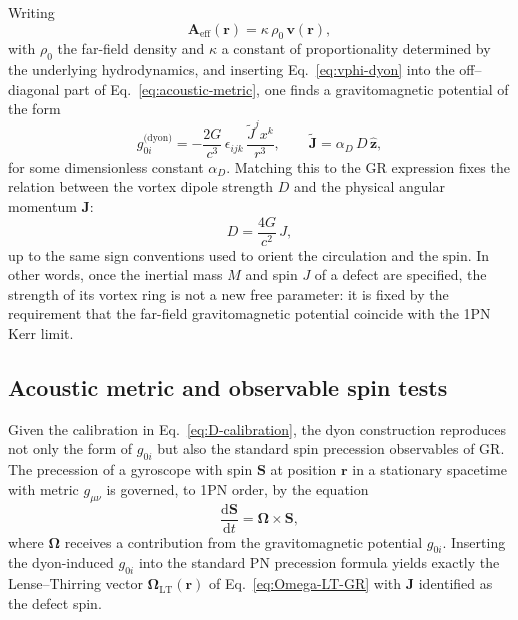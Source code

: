 \documentclass[11pt]{article}
\newcommand{\dd}{\mathrm{d}}
\begin{document}
Writing
\begin{equation}
  \mathbf{A}_{\text{eff}}(\mathbf{r})
  = \kappa\,\rho_0\,\mathbf{v}(\mathbf{r}),
\end{equation}
with $\rho_0$ the far-field density and $\kappa$ a constant of
proportionality determined by the underlying hydrodynamics, and
inserting Eq.~\eqref{eq:vphi-dyon} into the off–diagonal part of
Eq.~\eqref{eq:acoustic-metric}, one finds a gravitomagnetic potential
of the form
\begin{equation}
  g_{0i}^{\text{(dyon)}}
  = -\frac{2G}{c^3}\,
    \epsilon_{ijk}\,\frac{\tilde{J}^j x^k}{r^3},
  \qquad
  \tilde{\mathbf{J}}
  = \alpha_D\,D\,\hat{\mathbf{z}},
\end{equation}
for some dimensionless constant $\alpha_D$.
Matching this to the GR expression fixes the relation between the
vortex dipole strength $D$ and the physical angular momentum
$\mathbf{J}$:
\begin{equation}
  D = \frac{4G}{c^2}\,J,
  \label{eq:D-calibration}
\end{equation}
up to the same sign conventions used to orient the circulation and
the spin.
In other words, once the inertial mass $M$ and spin $J$ of a defect
are specified, the strength of its vortex ring is not a new free
parameter: it is fixed by the requirement that the far-field
gravitomagnetic potential coincide with the 1PN Kerr limit.

\subsection{Acoustic metric and observable spin tests}
\label{subsec:spin-observables}

Given the calibration in Eq.~\eqref{eq:D-calibration}, the dyon
construction reproduces not only the form of $g_{0i}$ but also the
standard spin precession observables of GR.
The precession of a gyroscope with spin $\mathbf{S}$ at position
$\mathbf{r}$ in a stationary spacetime with metric $g_{\mu\nu}$ is
governed, to 1PN order, by the equation
\begin{equation}
  \frac{\dd\mathbf{S}}{\dd t}
  = \bm{\Omega}\times\mathbf{S},
\end{equation}
where $\bm{\Omega}$ receives a contribution from the
gravitomagnetic potential $g_{0i}$.
Inserting the dyon-induced $g_{0i}$ into the standard PN precession
formula yields exactly the Lense--Thirring vector
$\bm{\Omega}_{\text{LT}}(\mathbf{r})$ of Eq.~\eqref{eq:Omega-LT-GR}
with $\mathbf{J}$ identified as the defect spin.
\end{document}
